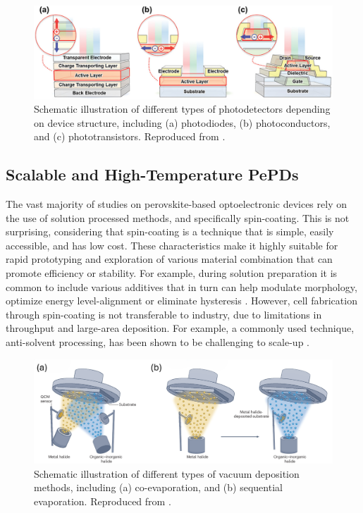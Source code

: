 \begin{figure}[htbp]
  \centering
  \medskip
  \includegraphics[width=.9\textwidth]{chapters/introduction/image/types_of_detector.jpg}
  \caption[Comparison of photodetector structures.]{Schematic illustration of different types of photodetectors depending on device structure, including (a) photodiodes, (b) photoconductors, and (c) phototransistors. Reproduced from \cite{Yoo2021ADirections}.}
  \label{fig:ch2:types_of_detector}
\end{figure}

\subsection{Scalable and High-Temperature PePDs} \label{ch1:scalable_high_temp}


The vast majority of studies on perovskite-based optoelectronic devices rely on the use of solution processed methods, and specifically spin-coating. This is not surprising, considering that spin-coating is a technique that is simple, easily accessible, and has low cost. These characteristics make it highly suitable for rapid prototyping and exploration of various material combination that can promote efficiency or stability. For example, during solution preparation it is common to include various additives that in turn can help modulate morphology, optimize energy level-alignment or eliminate hysteresis \cite{Liu2020ACells}. However, cell fabrication through spin-coating is not transferable to industry, due to limitations in throughput and large-area deposition. For example, a commonly used technique, anti-solvent processing, has been shown to be challenging to scale-up \cite{Saki2021Solution-processedCells}.

\begin{figure}[htbp]
  \centering
  \medskip
  \includegraphics[width=.99\textwidth]{chapters/introduction/image/types_of_evaporation.png}
  \caption[Comparison of vacuum deposition approaches.]{Schematic illustration of different types of vacuum deposition methods, including (a) co-evaporation, and (b) sequential evaporation. Reproduced from \cite{Han2025PerovskiteCells}.}
  \label{fig:ch2:types_of_evaporation}
\end{figure}

